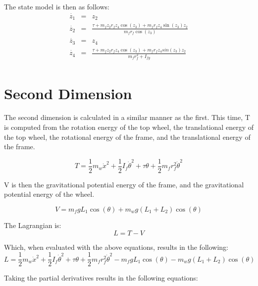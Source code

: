 \documentclass{article}
\begin{document}
The state model is then as follows:
\begin{eqnarray}
\dot{z_{1}} &=& z_{2} \nonumber \\
\dot{z_{2}} &=& \frac{\tau + m_{f} z_{2} r_{f} z_{4}  \cos(z_{3}) + m_{f} r_{f} z_{4} \sin(z_{3}) z_{2}}{m_{f} r_{f} \cos(z_{3})} \nonumber \\
\dot{z_{3}} &=& z_{4} \nonumber \\
\dot{z_{4}} &=& \frac{\tau + m_{f} z_{2} r_{f} z_{4} \cos(z_{3}) + m_{f} r_{f} z_{4} sin(z_{3}) z_{2}}{m_{f} r_{f}^2 + I_{fg}} \nonumber \\
\end{eqnarray}

\newpage

 
\section{Second Dimension}
The second dimension is calculated in a similar manner as the first.  This time, T is computed from the rotation energy of the top wheel, the translational energy of the top wheel, the rotational energy of the frame, and the translational energy of the frame. 
 
\begin{equation}
T = \frac{1}{2} m_{w} \dot{x}^2 + \frac{1}{2} I_{f} \dot{\theta}^2 + \tau \theta + \frac{1}{2} m_{f} r_{f}^2 \dot{\theta}^2
\end{equation}

V is then the gravitational potential energy of the frame, and the gravitational potential energy of the wheel.

\begin{equation}
V = m_{f} g L_{1} \cos(\theta) + m_{w} g (L_{1} + L_{2}) \cos(\theta)
\end{equation}

The Lagrangian is:
\begin{equation}
L = T - V
\end{equation}

Which, when evaluated with the above equations, results in the following:
\begin{equation}
L = \frac{1}{2} m_{w} \dot{x}^2 + \frac{1}{2} I_{f} \dot{\theta}^2 + \tau \theta + \frac{1}{2} m_{f} r_{f}^2 \dot{\theta}^2 - m_{f} g L_{1} \cos(\theta) - m_{w} g (L_{1} + L_{2}) \cos(\theta)
\end{equation}

Taking the partial derivatives results in the following equations:
\end{document}
